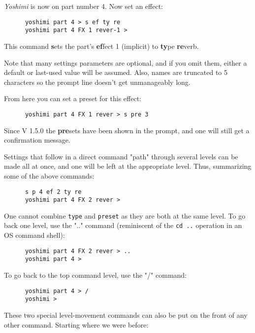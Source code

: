    \textsl{Yoshimi} is now on part number 4. Now set an effect:

   \begin{verbatim}
      yoshimi part 4 > s ef ty re
      yoshimi part 4 FX 1 rever-1 >
   \end{verbatim}

   This command \textbf{s}ets the part's \textbf{ef}fect 1 (implicit) to
   \textbf{ty}pe \textbf{re}verb.

   Note that many settings parameters are optional, and if you omit them,
   either a default or last-used value will be assumed. Also, names are
   truncated to 5 characters so the prompt line doesn't get unmanageably long.

   From here you can set a preset for this effect:

   \begin{verbatim}
      yoshimi part 4 FX 1 rever > s pre 3
   \end{verbatim}

   Since V 1.5.0 the \textbf{pre}sets have been shown in the prompt, and one
   will still get a confirmation message.

   Settings that follow in a direct command "path" through several levels
   can be made all at once, and one will be left at the appropriate level.
   Thus, summarizing some of the above commands:

   \begin{verbatim}
      s p 4 ef 2 ty re
      yoshimi part 4 FX 2 rever >
   \end{verbatim}

   One cannot combine \texttt{type} and \texttt{preset} as they
   are both at the same level.  To go back one level, use the
   ".." command (reminiscent of the \texttt{cd ..} operation in an OS command
   shell):

   \begin{verbatim}
      yoshimi part 4 FX 2 rever > ..
      yoshimi part 4 >
   \end{verbatim}

   To go back to the top command level, use the "/" command:

   \begin{verbatim}
      yoshimi part 4 > /
      yoshimi >
   \end{verbatim}

   These two special level-movement commands can also be put on the front of
   any other command.  Starting where we were before:

